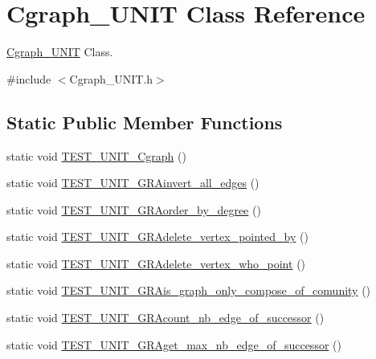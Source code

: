 \hypertarget{class_cgraph___u_n_i_t}{}\section{Cgraph\+\_\+\+U\+N\+I\+T Class Reference}
\label{class_cgraph___u_n_i_t}


\hyperlink{class_cgraph___u_n_i_t}{Cgraph\+\_\+\+U\+N\+I\+T} Class.  




{\ttfamily \#include $<$Cgraph\+\_\+\+U\+N\+I\+T.\+h$>$}

\subsection*{Static Public Member Functions}
\begin{DoxyCompactItemize}
\item 
static void \hyperlink{class_cgraph___u_n_i_t_a29c14b501b4f3a2817d6a14d5b568307}{T\+E\+S\+T\+\_\+\+U\+N\+I\+T\+\_\+\+Cgraph} ()
\item 
static void \hyperlink{class_cgraph___u_n_i_t_ab142f6971ed6d618bd1fc0f9184dd15c}{T\+E\+S\+T\+\_\+\+U\+N\+I\+T\+\_\+\+G\+R\+Ainvert\+\_\+all\+\_\+edges} ()
\item 
static void \hyperlink{class_cgraph___u_n_i_t_a071d6a9b3cf10fbf6e4df4b4f4ab3cf0}{T\+E\+S\+T\+\_\+\+U\+N\+I\+T\+\_\+\+G\+R\+Aorder\+\_\+by\+\_\+degree} ()
\item 
static void \hyperlink{class_cgraph___u_n_i_t_a700c98335586d8fd6a7531f1d57d3e8e}{T\+E\+S\+T\+\_\+\+U\+N\+I\+T\+\_\+\+G\+R\+Adelete\+\_\+vertex\+\_\+pointed\+\_\+by} ()
\item 
static void \hyperlink{class_cgraph___u_n_i_t_aad8b307ef9198f317b10502b2a5ae948}{T\+E\+S\+T\+\_\+\+U\+N\+I\+T\+\_\+\+G\+R\+Adelete\+\_\+vertex\+\_\+who\+\_\+point} ()
\item 
static void \hyperlink{class_cgraph___u_n_i_t_accbc36bc192166027e6c0c8229082896}{T\+E\+S\+T\+\_\+\+U\+N\+I\+T\+\_\+\+G\+R\+Ais\+\_\+graph\+\_\+only\+\_\+compose\+\_\+of\+\_\+comunity} ()
\item 
static void \hyperlink{class_cgraph___u_n_i_t_a569fde8a55e8446913343d890ad74135}{T\+E\+S\+T\+\_\+\+U\+N\+I\+T\+\_\+\+G\+R\+Acount\+\_\+nb\+\_\+edge\+\_\+of\+\_\+successor} ()
\item 
static void \hyperlink{class_cgraph___u_n_i_t_ab9f21378117552df0b72ed262bd33aa4}{T\+E\+S\+T\+\_\+\+U\+N\+I\+T\+\_\+\+G\+R\+Aget\+\_\+max\+\_\+nb\+\_\+edge\+\_\+of\+\_\+successor} ()
\end{DoxyCompactItemize}



